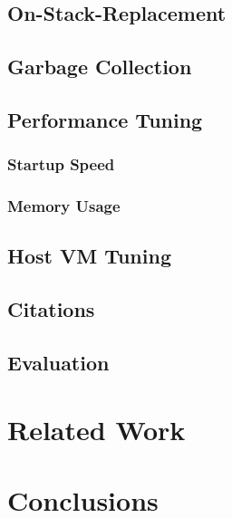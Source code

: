 \documentclass{acm_proc_article-sp}
\begin{document}
\subsection{On-Stack-Replacement}

\subsection{Garbage Collection}

\subsection{Performance Tuning}

\subsubsection{Startup Speed}

\subsubsection{Memory Usage}

\subsection{Host VM Tuning}

\subsection{Citations}

\subsection{Evaluation}

\section{Related Work}

\section{Conclusions}


\end{document}
